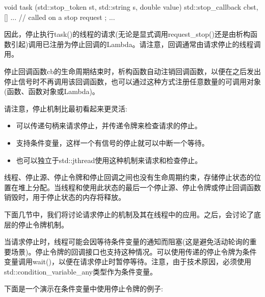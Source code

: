 \begin{cpp}
void task (std::stop_token st,
std::string s, double value)
{
	std::stop_callback cb{st, [] {
							   ... // called on a stop request
							  }};
	...
}
\end{cpp}

因此，停止执行task()的线程的请求(无论是显式调用request\_stop()还是由析构函数引起)调用已注册为停止回调的Lambda。请注意，回调通常由请求停止的线程调用。

停止回调函数cb的生命周期结束时，析构函数自动注销回调函数，以便在之后发出停止信号时不再调用该回调函数，也可以通过这种方式注册任意数量的可调用对象(函数、函数对象或Lambda)。

请注意，停止机制比最初看起来更灵活:

\begin{itemize}
\item 
可以传递句柄来请求停止，并传递令牌来检查请求的停止。

\item 
支持条件变量，这样一个有信号的停止就可以中断一个等待。

\item 
也可以独立于std::jthread使用这种机制来请求和检查停止。
\end{itemize}

线程、停止源、停止令牌和停止回调之间也没有生命周期约束，存储停止状态的位置在堆上分配。当线程和使用此状态的最后一个停止源、停止令牌或停止回调函数销毁时，用于停止状态的内存将释放。

下面几节中，我们将讨论请求停止的机制及其在线程中的应用。之后，会讨论了底层的停止令牌机制。


当请求停止时，线程可能会因等待条件变量的通知而阻塞(这是避免活动轮询的重要场景)。停止令牌的回调接口也支持这种情况。可以使用传递的停止令牌为条件变量调用wait()，以便在请求停止时暂停等待。注意，由于技术原因，必须使用std::condition\_variable\_any类型作为条件变量。

下面是一个演示在条件变量中使用停止令牌的例子:


